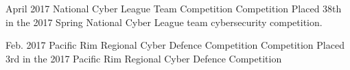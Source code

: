 \documentclass[10pt]{article} %
\begin{document}
\award
{April 2017}
{ }
{National Cyber League Team Competition}
{}
{Competition}
{Placed 38th in the 2017 Spring National Cyber League team cybersecurity competition.}

\award
{Feb. 2017}
{ }
{Pacific Rim Regional Cyber Defence Competition}
{}
{Competition}
{Placed 3rd in the 2017 Pacific Rim Regional Cyber Defence Competition}



\end{document}
